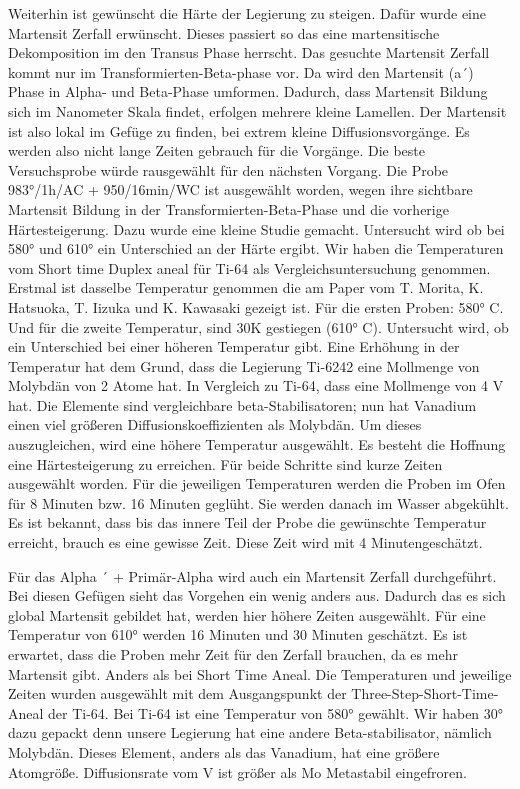 Weiterhin ist gewünscht die Härte der Legierung zu steigen. Dafür wurde eine Martensit Zerfall erwünscht. Dieses passiert so das eine martensitische Dekomposition im den Transus Phase herrscht.  
Das gesuchte Martensit Zerfall kommt nur im Transformierten-Beta-phase vor. Da wird den Martensit (a´) Phase in Alpha- und Beta-Phase umformen. Dadurch, dass Martensit Bildung sich im Nanometer Skala findet, erfolgen mehrere kleine Lamellen. Der Martensit ist also lokal im Gefüge zu finden, bei extrem kleine Diffusionsvorgänge. Es werden also nicht lange Zeiten gebrauch für die Vorgänge.
Die beste Versuchsprobe würde rausgewählt für den nächsten Vorgang. Die Probe 983°/1h/AC + 950/16min/WC ist ausgewählt worden, wegen ihre sichtbare Martensit Bildung in der Transformierten-Beta-Phase und die vorherige Härtesteigerung. Dazu wurde eine kleine Studie gemacht. Untersucht wird ob bei 580° und 610° ein Unterschied an der Härte ergibt. Wir haben die Temperaturen vom Short time Duplex aneal für Ti-64 als Vergleichsuntersuchung genommen. Erstmal ist dasselbe Temperatur genommen die am Paper vom T. Morita, K. Hatsuoka, T. Iizuka und K. Kawasaki gezeigt ist. Für die ersten Proben: 580° C. Und für die zweite Temperatur, sind 30K gestiegen (610° C). Untersucht wird, ob ein Unterschied bei einer höheren Temperatur gibt. Eine Erhöhung in der Temperatur hat dem Grund, dass die Legierung Ti-6242 eine Mollmenge von Molybdän von 2 Atome hat. In Vergleich zu Ti-64, dass eine Mollmenge von 4 V hat. Die Elemente sind vergleichbare beta-Stabilisatoren; nun hat Vanadium einen viel größeren Diffusionskoeffizienten als Molybdän. Um dieses auszugleichen, wird eine höhere Temperatur ausgewählt. Es besteht die Hoffnung eine Härtesteigerung zu erreichen. Für beide Schritte sind kurze Zeiten ausgewählt worden. Für die jeweiligen Temperaturen werden die Proben im Ofen für 8 Minuten bzw. 16 Minuten geglüht. Sie werden danach im Wasser abgekühlt. 
Es ist bekannt, dass bis das innere Teil der Probe die gewünschte Temperatur erreicht, brauch es eine gewisse Zeit. Diese Zeit wird mit 4 Minutengeschätzt. 

Für das Alpha ´ + Primär-Alpha wird auch ein Martensit Zerfall durchgeführt. Bei diesen Gefügen sieht das Vorgehen ein wenig anders aus. Dadurch das es sich global Martensit gebildet hat, werden hier höhere Zeiten ausgewählt. Für eine Temperatur von 610° werden 16 Minuten und 30 Minuten geschätzt. Es ist erwartet, dass die Proben mehr Zeit für den Zerfall brauchen, da es mehr Martensit gibt. Anders als bei Short Time Aneal. 
Die Temperaturen und jeweilige Zeiten wurden ausgewählt mit dem Ausgangspunkt der Three-Step-Short-Time-Aneal der Ti-64. Bei Ti-64 ist eine Temperatur von 580° gewählt. Wir haben 30° dazu gepackt denn unsere Legierung hat eine andere Beta-stabilisator, nämlich Molybdän. Dieses Element, anders als das Vanadium, hat eine größere Atomgröße. Diffusionsrate vom V ist größer als Mo Metastabil eingefroren. 





